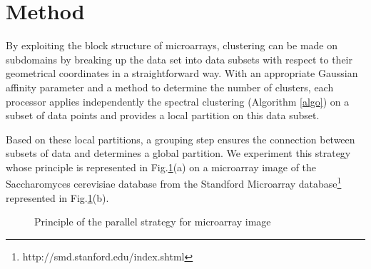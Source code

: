 \documentclass[runningheads,a4paper]{llncs}
\begin{document}

\section{Method} \label{method}

By exploiting the block structure of microarrays, clustering can be made on
subdomains by breaking up the data set into data subsets with respect to their
geometrical coordinates in a straightforward way. With an appropriate Gaussian
affinity parameter and a method to determine the number of clusters, each
processor applies independently the spectral clustering (Algorithm \ref{algo})
on a subset of data points and provides a local partition on this data
subset.

Based on these local partitions, a grouping step ensures the connection
between subsets of data and determines a global partition. We experiment this
strategy whose principle is represented in Fig.\ref{fig:principe}(a) on a
microarray image of the Saccharomyces cerevisiae database from the Standford
Microarray database\footnote{http://smd.stanford.edu/index.shtml} represented
in Fig.\ref{fig:principe}(b).

\begin{figure}
  \begin{center}
  \end{center}
  \caption{Principle of the parallel strategy for microarray image}
  \label{fig:principe}
\end{figure}
\end{document}
